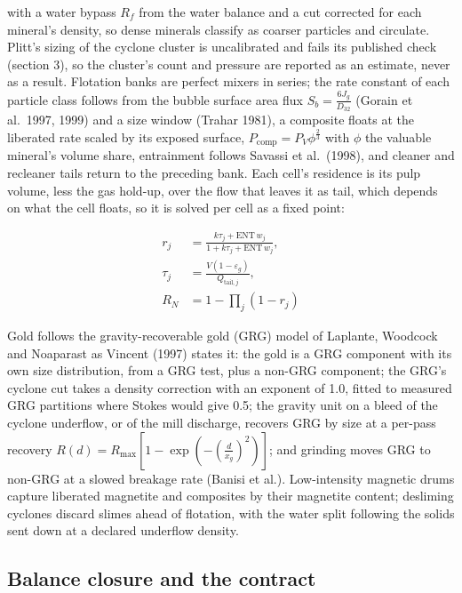 \documentclass[10pt]{article}
\begin{document}
with a water bypass \(R_f\) from the water balance and a cut corrected
for each mineral's density, so dense minerals classify as coarser
particles and circulate. Plitt's sizing of the cyclone cluster is
uncalibrated and fails its published check (section 3), so the cluster's
count and pressure are reported as an estimate, never as a result.
Flotation banks are perfect mixers in series; the rate constant of each
particle class follows from the bubble surface area flux
\(S_b=\frac{6J_g}{D_{32}}\) (Gorain et al.~1997, 1999) and a size window
(Trahar 1981), a composite floats at the liberated rate scaled by its
exposed surface, \(P_{\mathrm{comp}}=P_V\phi^{\frac{2}{3}}\) with
\(\phi\) the valuable mineral's volume share, entrainment follows
Savassi et al.~(1998), and cleaner and recleaner tails return to the
preceding bank. Each cell's residence is its pulp volume, less the gas
hold-up, over the flow that leaves it as tail, which depends on what the
cell floats, so it is solved per cell as a fixed point:

\[
\begin{aligned}
r_j&=\frac{k\tau_j+\mathrm{ENT}\,w_j}{1+k\tau_j+\mathrm{ENT}\,w_j},\\
\tau_j&=\frac{V(1-\varepsilon_g)}{Q_{\mathrm{tail},j}},\\
R_N&=1-\prod_j(1-r_j)
\end{aligned}
\]

Gold follows the gravity-recoverable gold (GRG) model of Laplante,
Woodcock and Noaparast as Vincent (1997) states it: the gold is a GRG
component with its own size distribution, from a GRG test, plus a
non-GRG component; the GRG's cyclone cut takes a density correction with
an exponent of 1.0, fitted to measured GRG partitions where Stokes would
give 0.5; the gravity unit on a bleed of the cyclone underflow, or of
the mill discharge, recovers GRG by size at a per-pass recovery
\(R(d)=R_{\max}\left[1-\exp\!\left(-\left(\frac{d}{x_g}\right)^2\right)\right]\);
and grinding moves GRG to non-GRG at a slowed breakage rate (Banisi et
al.). Low-intensity magnetic drums capture liberated magnetite and
composites by their magnetite content; desliming cyclones discard slimes
ahead of flotation, with the water split following the solids sent down
at a declared underflow density.

\subsection{Balance closure and the
contract}\label{balance-closure-and-the-contract}
\end{document}
